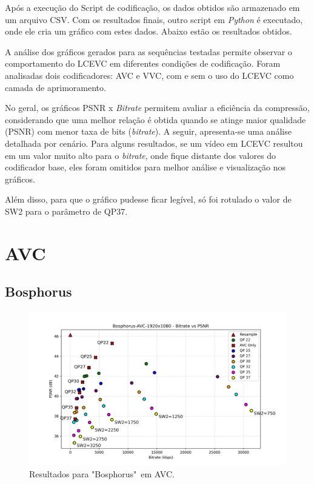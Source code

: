 Após a execução do Script de codificação, os dados obtidos são armazenado
em um arquivo CSV. Com os resultados finais, outro script em \textit{Python} é
executado, onde ele cria um gráfico com estes dados. Abaixo estão os resultados
obtidos.

A análise dos gráficos gerados para as sequências testadas permite observar o comportamento 
do \acrshort{LCEVC} em diferentes condições de codificação. Foram analisadas dois
codificadores: \acrshort{AVC} e \acrshort{VVC}, com e sem o uso do \acrshort{LCEVC} 
como camada de aprimoramento.

No geral, os gráficos \acrshort{PSNR} x \textit{Bitrate} permitem avaliar a eficiência da
compressão, considerando que uma melhor relação é obtida quando se atinge maior qualidade
(\acrshort{PSNR}) com menor taxa de bits (\textit{bitrate}). A seguir, apresenta-se uma
análise detalhada por cenário. Para alguns resultados, se um vídeo em \acrshort{LCEVC} 
resultou em um valor muito alto para o \textit{bitrate}, onde fique distante dos valores
do codificador base, eles foram omitidos para melhor análise e visualização nos gráficos.

Além disso, para que o gráfico pudesse ficar legível, só foi rotulado o valor de SW2 para
o parâmetro de QP37.

\newpage
\section{AVC}

\subsection{Bosphorus}
\begin{figure}[h]
    \centering
    \includegraphics[width=1.0\textwidth]{img/Bosphorus-AVC.png}
    \caption{Resultados para "Bosphorus"\ em \acrshort{AVC}. \cite{uvg_dataset}}
    \label{fig:bosphorus}
\end{figure}

